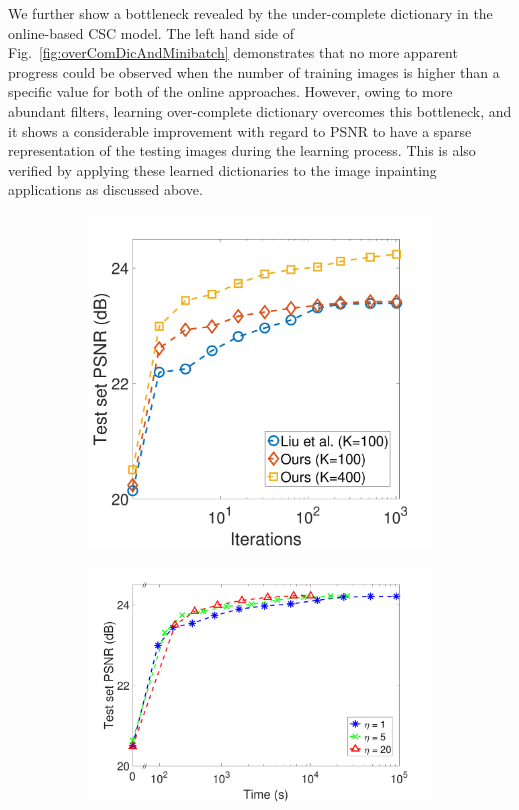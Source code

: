 We further show a bottleneck revealed by the under-complete dictionary in the online-based CSC model. The left hand side of Fig.~\ref{fig:overComDicAndMinibatch} demonstrates that no more apparent progress could be observed when the number of training images is higher than a specific value for both of the online approaches. However, owing to more abundant filters, learning over-complete dictionary overcomes this bottleneck, and it shows a considerable improvement with regard to PSNR to have a sparse representation of the testing images during the learning process. This is also verified by applying these learned dictionaries to the image inpainting applications as discussed above.

\begin{figure}[h]
\centering
\begin{subfigure}{0.4\textwidth}
  \includegraphics[width=1\linewidth]{figure/overComplete-ite.pdf}
\end{subfigure} 
\begin{subfigure}{0.55\textwidth}
  \includegraphics[width=1\linewidth]{figure/minibatch.pdf}
\end{subfigure}


\end{figure}
